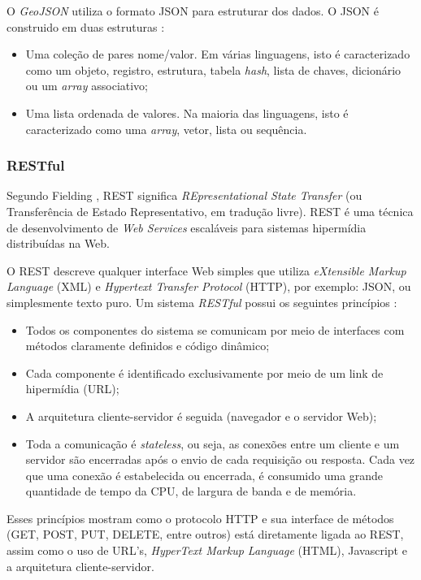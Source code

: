 O \textit{GeoJSON} utiliza o formato JSON para estruturar dos dados. O JSON é construido em duas estruturas \cite{json}:

\begin{itemize}
\item Uma coleção de pares nome/valor. Em várias linguagens, isto é caracterizado como um objeto, registro, estrutura, tabela \textit{hash}, lista de chaves, dicionário ou um \textit{array} associativo;
\item Uma lista ordenada de valores. Na maioria das linguagens, isto é caracterizado como uma \textit{array}, vetor, lista ou sequência.
\end{itemize}

\subsubsection{RESTful}

Segundo Fielding , REST significa \textit{REpresentational State Transfer} (ou Transferência de Estado Representativo, em tradução livre). REST é uma técnica de desenvolvimento de \textit{Web Services} escaláveis para sistemas hipermídia distribuídas na Web.

O REST descreve qualquer interface Web simples que utiliza \textit{eXtensible Markup Language} (XML) e \textit{Hypertext Transfer Protocol} (HTTP), por exemplo: JSON, ou simplesmente texto puro. Um sistema \textit{RESTful} possui os seguintes princípios \cite{rest}:

\begin{itemize}
\item Todos os componentes do sistema se comunicam por meio de interfaces com métodos claramente definidos e código dinâmico;
\item Cada componente é identificado exclusivamente por meio de um link de hipermídia (URL);
\item A arquitetura cliente-servidor é seguida (navegador e o servidor Web);
\item Toda a comunicação é \textit{stateless}, ou seja, as conexões entre um cliente e um servidor são encerradas após o envio de cada requisição ou resposta. Cada vez que uma conexão é estabelecida ou encerrada, é consumido uma grande quantidade de tempo da CPU, de largura de banda e de memória.
\end{itemize}

Esses princípios mostram como o protocolo HTTP e sua interface de métodos (GET, POST, PUT, DELETE, entre outros) está diretamente ligada ao REST, assim como o uso de URL’s, \textit{HyperText Markup Language} (HTML), Javascript e a arquitetura cliente-servidor.

